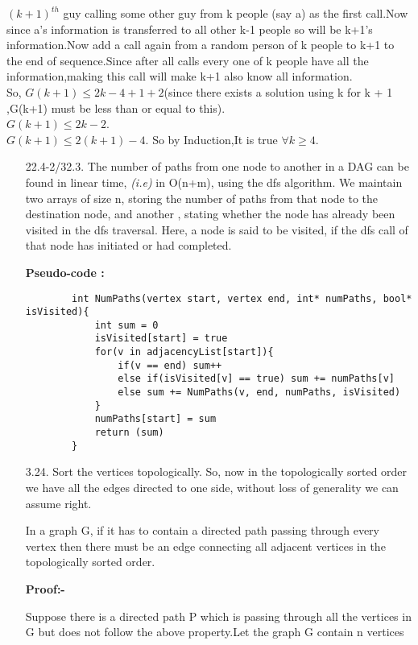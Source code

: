 \documentclass[12pt]{article}
\begin{document}
\begin{enumerate}
    $(k+1)^{th}$ guy calling some other guy from k people (say a) as the first call.Now since a's information is transferred to all other k-1 people so will be k+1's information.Now add a call again from a random person of k people to k+1 to the end of sequence.Since after all calls every one of k people have all the information,making this call will make k+1 also know all information.\\So, $G(k+1) \leq 2k-4+1+2$(since there exists a solution using k for k + 1 ,G(k+1) must be less than or equal to this).
    \\$G(k+1) \leq 2k-2$.\\$G(k+1) \leq 2(k+1) -4$.
    So by Induction,It is true $\forall k \geq 4$.
\end{enumerate}
\begin{enumerate}
    \item[22.4-2/32.3.] The number of paths from one node to another in a DAG can be found in linear time, \textit{(i.e)} in O(n+m), using the dfs algorithm. We maintain two arrays of size n, storing the number of paths from that node to the destination node, and another , stating whether the node has already been visited in the dfs traversal. Here, a node is said to be visited, if the dfs call of that node has initiated or had completed.
    
    \textbf{Pseudo-code :}
    \begin{verbatim}
        int NumPaths(vertex start, vertex end, int* numPaths, bool* isVisited){
            int sum = 0
            isVisited[start] = true
            for(v in adjacencyList[start]){
                if(v == end) sum++
                else if(isVisited[v] == true) sum += numPaths[v]
                else sum += NumPaths(v, end, numPaths, isVisited)
            }
            numPaths[start] = sum
            return (sum)
        }
    \end{verbatim}
    \item[3.24.] Sort the vertices topologically. So, now in the topologically sorted order we have all the edges directed to one side, without loss of generality we can assume right. 
    
    In a graph G, if it has to contain a directed path passing through every vertex then there must be an edge connecting all adjacent vertices in the topologically sorted order.
    
    \textbf{Proof:-}
    
    Suppose there is a directed path P which is passing through all the vertices in G but does not follow the above property.Let the graph G contain n vertices 
    

\end{enumerate}
\end{document}
